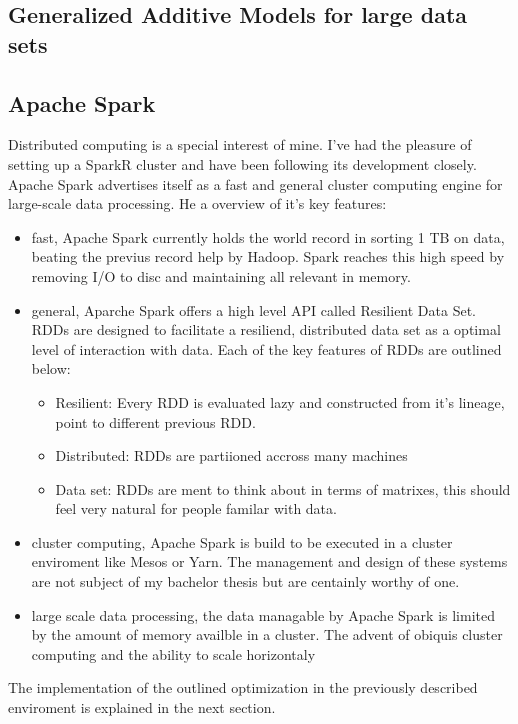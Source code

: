 \documentclass{article}
\begin{document}
    \subsection{Generalized Additive Models for large data sets}
    \cite{GAM}

    \subsection{Apache Spark}
    Distributed computing is a special interest of mine. I've had the pleasure of setting up a SparkR cluster and have been following its development closely. Apache Spark advertises itself as a fast and general cluster computing engine for large-scale data processing. He a overview of it's key features:
    \begin{itemize}
        \item fast, Apache Spark currently holds the world record in sorting 1 TB on data, beating the previus record help by Hadoop. Spark reaches this high speed by removing I/O to disc and maintaining all relevant in memory.
        \item general, Aparche Spark offers a high level API called Resilient Data Set. RDDs are designed to facilitate a resiliend, distributed data set as a optimal level of interaction with data. Each of the key features of RDDs are outlined below:
        \begin{itemize}
            \item Resilient: Every RDD is evaluated lazy and constructed from it's lineage, point to different previous RDD.
            \item Distributed: RDDs are partiioned accross many machines
            \item Data set: RDDs are ment to think about in terms of matrixes, this should feel very natural for people familar with data.
        \end{itemize}
        \item cluster computing, Apache Spark is build to be executed in a cluster enviroment like Mesos or Yarn. The management and design of these systems are not subject of my bachelor thesis but are centainly worthy of one.
        \item large scale data processing, the data managable by Apache Spark is limited by the amount of memory availble in a cluster. The advent of obiquis cluster computing and the ability to scale horizontaly
    \end{itemize} The implementation of the outlined optimization in the previously described enviroment is explained in the next section.
\end{document}
